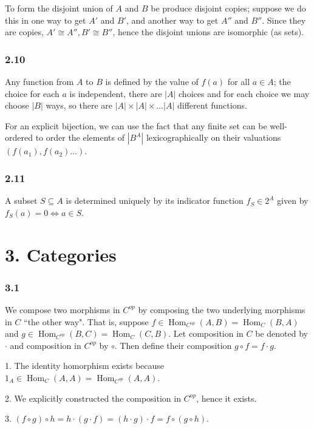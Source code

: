 \documentclass{article}
\DeclareMathOperator{\Hom}{Hom}
\begin{document}
To form the disjoint union of $A$ and $B$ be produce disjoint copies; suppose we do this in one way to get $A'$ and $B'$, and another way to get $A''$ and $B''$. Since they are copies, $A' \cong A'', B' \cong B''$, hence the disjoint unions are isomorphic (as sets).

\subsubsection*{2.10}

Any function from $A$ to $B$ is defined by the value of $f(a)$ for all $a \in A$; the choice for each $a$ is independent, there are $|A|$ choices and for each choice we may choose $|B|$ ways, so there are $|A| \times |A| \times \ldots |A|$ different functions.

For an explicit bijection, we can use the fact that any finite set can be well-ordered to order the elements of $|B^A|$ lexicographically on their valuations $(f(a_1), f(a_2) \ldots )$.

\subsubsection*{2.11}

A subset $S \subseteq A$ is determined uniquely by its indicator function $f_S \in 2^A$ given by $f_S(a) = 0 \iff a \in S$.

\section*{3. Categories}

\subsubsection*{3.1}

We compose two morphisms in $C^{op}$ by composing the two underlying morphisms in $C$ ``the other way". That is, suppose $f \in \Hom_{C^{op}}(A, B) = \Hom_C(B, A)$ and $g \in \Hom_{C^{op}}(B, C) = \Hom_C(C, B)$. Let composition in $C$ be denoted by $\cdot$ and composition in $C^{op}$ by $\circ$. Then define their composition $g \circ f = f \cdot g$.

1. The identity homorphism exists because $1_A \in \Hom_C(A, A) = \Hom_{C^{op}}(A, A)$.

2. We explicitly constructed the composition in $C^{op}$, hence it exists.

3. $(f \circ g) \circ h = h \cdot (g \cdot f) = (h \cdot g) \cdot f = f \circ (g \circ h)$.
\end{document}
